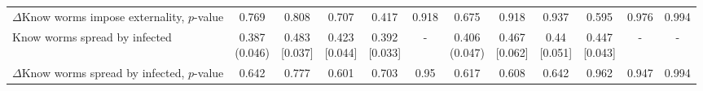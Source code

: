 {\begin{tabular}[t]{lccccccccccc}
$\Delta$Know worms impose externality, $p$-value & 0.769 & 0.808 & 0.707 & 0.417 & 0.918 & 0.675 & 0.918 & 0.937 & 0.595 & 0.976 & 0.994\\
Know worms spread by infected & \makecell[c]{0.387\\(0.046)} & \makecell[c]{0.483\\{[0.037]}} & \makecell[c]{0.423\\{[0.044]}} & \makecell[c]{0.392\\{[0.033]}} & - & \makecell[c]{0.406\\(0.047)} & \makecell[c]{0.467\\{[0.062]}} & \makecell[c]{0.44\\{[0.051]}} & \makecell[c]{0.447\\{[0.043]}} & - & -\\
$\Delta$Know worms spread by infected, $p$-value & 0.642 & 0.777 & 0.601 & 0.703 & 0.95 & 0.617 & 0.608 & 0.642 & 0.962 & 0.947 & 0.994\\
\bottomrule
\end{tabular}}

